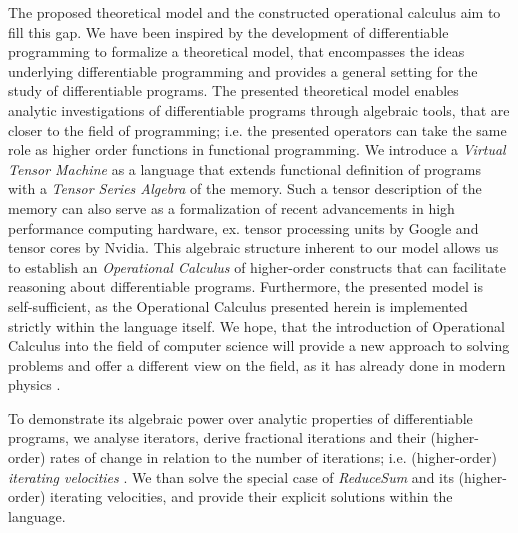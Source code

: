 The proposed theoretical model and the constructed operational calculus aim to
fill this gap. We have been inspired by the development of differentiable programming to
formalize a theoretical model, that encompasses the ideas underlying
differentiable programming and provides a general setting for the study of
differentiable programs. The presented theoretical model enables analytic
investigations of differentiable programs through algebraic tools, that are
closer to the field of programming; i.e. the presented operators can take the
same role as higher order functions in functional programming. We introduce a
\emph{Virtual Tensor Machine} as a language that extends functional definition
of programs with a \emph{Tensor Series Algebra} of the memory. Such a tensor
description of the memory can also serve as a formalization of recent
advancements in high performance computing hardware, ex. tensor processing
units by Google and tensor cores by Nvidia. This algebraic structure inherent
to our model allows us to establish an \emph{Operational Calculus} of
higher-order constructs that can facilitate reasoning about differentiable
programs. Furthermore, the presented model is self-sufficient, as the
Operational Calculus presented herein is implemented strictly within the
language itself. We hope, that the introduction of Operational Calculus into the
field of computer science will provide a new approach to solving problems and offer
a different view on the field, as it has already done in modern physics \cite{OpCalc}.

To demonstrate its algebraic power over analytic properties of
differentiable programs, we analyse iterators, derive fractional iterations and
their (higher-order) rates of change in relation to the number of iterations;
i.e. (higher-order) \emph{ iterating velocities }. We than solve the special
case of \emph{ReduceSum} and its (higher-order) iterating velocities, and
provide their explicit solutions within the language.

